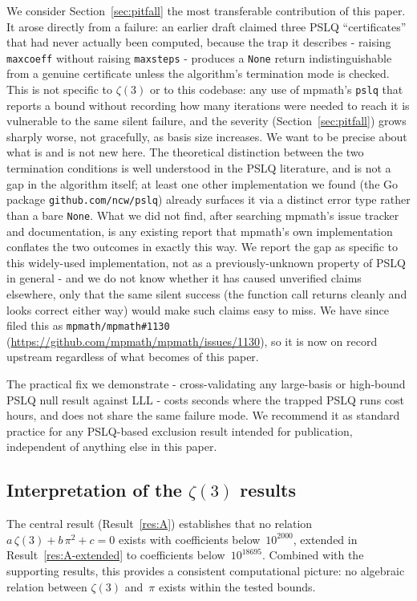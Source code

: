 \documentclass[12pt]{article}
\theoremstyle{definition}
\theoremstyle{remark}
\begin{document}
We consider Section~\ref{sec:pitfall} the most transferable
contribution of this paper.  It arose directly from a failure: an
earlier draft claimed three PSLQ ``certificates'' that had never
actually been computed, because the trap it describes - raising
\texttt{maxcoeff} without raising \texttt{maxsteps} - produces a
\texttt{None} return indistinguishable from a genuine certificate
unless the algorithm's termination mode is checked.  This is not
specific to $\zeta(3)$ or to this codebase: any use of mpmath's
\texttt{pslq} that reports a bound without recording how many
iterations were needed to reach it is vulnerable to the same silent
failure, and the severity (Section~\ref{sec:pitfall}) grows sharply
worse, not gracefully, as basis size increases.  We want to be precise
about what is and is not new here.  The theoretical distinction
between the two termination conditions is well understood in the
PSLQ literature, and is not a gap in the algorithm itself; at least
one other implementation we found (the Go package
\texttt{github.com/ncw/pslq}) already surfaces it via a distinct
error type rather than a bare \texttt{None}.  What we did not find,
after searching mpmath's issue tracker and documentation, is any
existing report that mpmath's own implementation conflates the two
outcomes in exactly this way.  We report the gap as specific to this
widely-used implementation, not as a previously-unknown property of
PSLQ in general - and we do not know whether it has caused unverified
claims elsewhere, only that the same silent success (the function call
returns cleanly and looks correct either way) would make such claims
easy to miss.  We have since filed this as
\texttt{mpmath/mpmath\#1130}
(\url{https://github.com/mpmath/mpmath/issues/1130}), so it is now on
record upstream regardless of what becomes of this paper.

The practical fix we demonstrate - cross-validating any large-basis
or high-bound PSLQ null result against LLL - costs seconds where the
trapped PSLQ runs cost hours, and does not share the same failure
mode.  We recommend it as standard practice for any PSLQ-based
exclusion result intended for publication, independent of anything
else in this paper.

\subsection{Interpretation of the $\zeta(3)$ results}

The central result (Result~\ref{res:A}) establishes that no relation
$a\,\zeta(3)+b\,\pi^2+c=0$ exists with coefficients below~$10^{2000}$,
extended in Result~\ref{res:A-extended} to coefficients
below~$10^{18695}$.  Combined with the supporting results, this
provides a consistent computational picture: no algebraic relation
between $\zeta(3)$ and~$\pi$ exists within the tested bounds.
\end{document}
